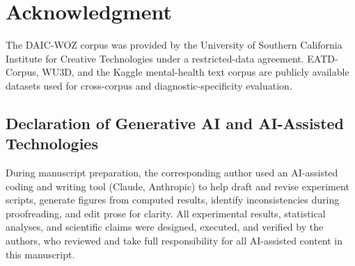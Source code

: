 \documentclass[journal]{IEEEtran}
\begin{document}
\section*{Acknowledgment}
The DAIC-WOZ corpus was provided by the University of Southern
California Institute for Creative Technologies under a restricted-data
agreement. EATD-Corpus, WU3D, and the Kaggle mental-health text corpus
\cite{sarkar2022mentalhealth} are publicly available datasets used for
cross-corpus and diagnostic-specificity evaluation.

\subsection*{Declaration of Generative AI and AI-Assisted Technologies}
During manuscript preparation, the corresponding author used an
AI-assisted coding and writing tool (Claude, Anthropic) to help draft
and revise experiment scripts, generate figures from computed results,
identify inconsistencies during proofreading, and edit prose for
clarity. All experimental results, statistical analyses, and
scientific claims were designed, executed, and verified by the
authors, who reviewed and take full responsibility for all AI-assisted
content in this manuscript.


\end{document}
